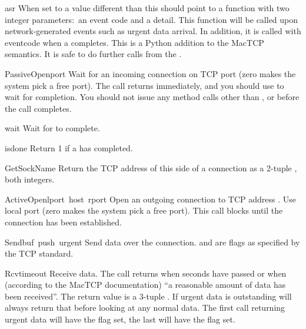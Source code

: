 \begin{datadesc}{asr}
When set to a value different than  this should point to a
function with two integer parameters:\ an event code and a detail. This
function will be called upon network-generated events such as urgent
data arrival. In addition, it is called with eventcode
 when a  completes. This
is a Python addition to the MacTCP semantics.
It is safe to do further calls from the .
\end{datadesc}

\renewcommand{\indexsubitem}{(TCP stream method)}

\begin{funcdesc}{PassiveOpen}{port}
Wait for an incoming connection on TCP port  (zero makes the
system pick a free port). The call returns immediately, and you should
use  to wait for completion. You should not issue any method
calls other than
,  or  before the call
completes.
\end{funcdesc}

\begin{funcdesc}{wait}{}
Wait for  to complete.
\end{funcdesc}

\begin{funcdesc}{isdone}{}
Return 1 if a  has completed.
\end{funcdesc}

\begin{funcdesc}{GetSockName}{}
Return the TCP address of this side of a connection as a 2-tuple
, both integers.
\end{funcdesc}

\begin{funcdesc}{ActiveOpen}{lport\, host\, rport}
Open an outgoing connection to TCP address . Use
local port  (zero makes the system pick a free port). This
call blocks until the connection has been established.
\end{funcdesc}

\begin{funcdesc}{Send}{buf\, push\, urgent}
Send data  over the connection.  and 
are flags as specified by the TCP standard.
\end{funcdesc}

\begin{funcdesc}{Rcv}{timeout}
Receive data. The call returns when  seconds have passed
or when (according to the MacTCP documentation) ``a reasonable amount
of data has been received''. The return value is a 3-tuple
. If urgent data is outstanding 
will always return that before looking at any normal data. The first
call returning urgent data will have the  flag set, the
last will have the  flag set.
\end{funcdesc}

